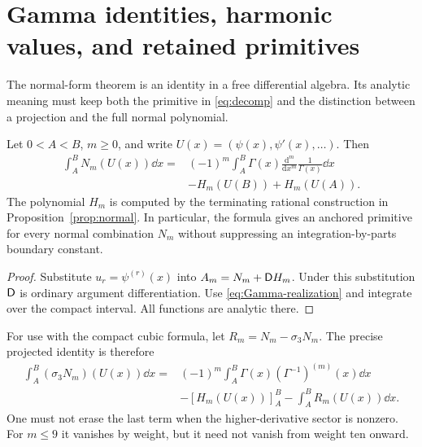 \section{Gamma identities, harmonic values, and retained primitives}
\label{sec:gamma}

The normal-form theorem is an identity in a free differential algebra.
Its analytic meaning must keep both the primitive in
\eqref{eq:decomp} and the distinction between a projection and the full
normal polynomial.

\begin{theorem}\label{thm:endpoint}
Let $0<A<B$, $m\ge0$, and write
$U(x)=(\psi(x),\psi'(x),\ldots)$. Then
\begin{equation}\label{eq:Gamma-endpoint}
\begin{split}
 \int_A^B N_m(U(x))\dd x
 ={}&(-1)^m\int_A^B\Gamma(x)
       \frac{\mathrm d^m}{\mathrm dx^m}\frac1{\Gamma(x)}\dd x\\
 &-H_m(U(B))+H_m(U(A)).
\end{split}
\end{equation}
The polynomial $H_m$ is computed by the terminating rational construction
in Proposition~\ref{prop:normal}. In particular, the formula gives an
anchored primitive for every normal combination $N_m$ without suppressing
an integration-by-parts boundary constant.
\end{theorem}
\begin{proof}
Substitute $u_r=\psi^{(r)}(x)$ into
$A_m=N_m+\mathsf D H_m$. Under this substitution $\mathsf D$ is ordinary argument
differentiation. Use \eqref{eq:Gamma-realization} and integrate over the
compact interval. All functions are analytic there.
\end{proof}

For use with the compact cubic formula, let
$R_m=N_m-\sigma_3N_m$. The precise projected identity is therefore
\begin{equation}\label{eq:projected-endpoint}
\begin{split}
 \int_A^B(\sigma_3N_m)(U(x))\dd x
 ={}&(-1)^m\int_A^B\Gamma(x)(\Gamma^{-1})^{(m)}(x)\dd x\\
 &-[H_m(U(x))]_A^B-\int_A^BR_m(U(x))\dd x.
\end{split}
\end{equation}
One must not erase the last term when the higher-derivative sector is
nonzero. For $m\le9$ it vanishes by weight, but it need not vanish from
weight ten onward.

